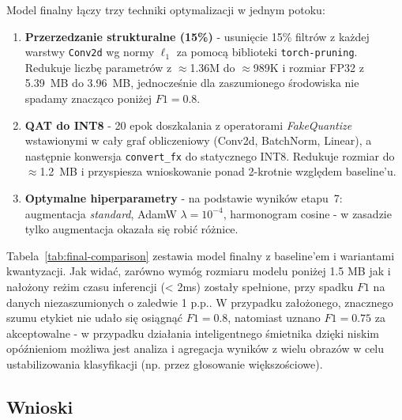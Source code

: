 \documentclass[12pt,twocolumn]{article}
\begin{document}
Model finalny łączy trzy techniki optymalizacji w jednym potoku:

\begin{enumerate}
  \item \textbf{Przerzedzanie strukturalne (15\%)} - usunięcie 15\%
        filtrów z każdej warstwy \texttt{Conv2d} wg normy $\ell_1$
        za pomocą biblioteki \texttt{torch-pruning}. Redukuje liczbę
        parametrów z $\approx$1.36M do $\approx$989K i rozmiar FP32
        z 5.39~MB do 3.96~MB, jednocześnie dla zaszumionego środowiska nie spadamy znacząco poniżej $F1 = 0.8$.

  \item \textbf{QAT do INT8} - 20 epok doszkalania z operatorami
        \textit{FakeQuantize} wstawionymi w cały graf obliczeniowy
        (Conv2d, BatchNorm, Linear), a następnie konwersja
        \texttt{convert\_fx} do statycznego INT8.
        Redukuje rozmiar do $\approx$1.2~MB i przyspiesza wnioskowanie
        ponad 2-krotnie względem baseline'u.

  \item \textbf{Optymalne hiperparametry} - na podstawie wyników
        etapu~7: augmentacja \emph{standard}, AdamW $\lambda=10^{-4}$,
        harmonogram cosine - w zasadzie tylko augmentacja okazała się robić różnice.
\end{enumerate}

Tabela~\ref{tab:final-comparison} zestawia model finalny z baseline'em
i wariantami kwantyzacji. Jak widać, zarówno wymóg rozmiaru modelu poniżej 1.5 MB jak i nałożony reżim czasu inferencji (< 2ms) zostały spełnione,
przy spadku $F1$ na danych niezaszumionych o zaledwie 1 p.p.. W przypadku założonego, znacznego szumu etykiet nie udało się osiągnąć $F1=0.8$, natomiast uznano $F1=0.75$ za
akceptowalne - w przypadku działania inteligentnego śmietnika dzięki niskim opóźnieniom możliwa jest analiza i agregacja wyników z wielu obrazów w celu ustabilizowania klasyfikacji (np. przez głosowanie większościowe).



\subsection{Wnioski}
\end{document}
